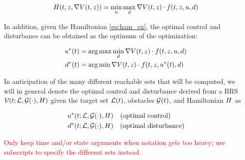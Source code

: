 \begin{equation}
\label{eq:ham_ex}
\begin{aligned}
\ham(t, \state, \nabla \valfunc(t,\state)) = \min_\ctrl \max_\dstb \nabla \valfunc(t,\state) \cdot \fdyn(t, \state, \ctrl, \dstb)
\end{aligned}
\end{equation}

In addition, given the Hamiltonian \eqref{eq:ham_ex}, the optimal control and disturbance can be obtained as the optimum of the optimization:

\begin{equation}
\label{eq:opt_ctrl_dstb_ex}
\begin{aligned}
\ctrl^*(t) &= \arg \max \min_\dstb \nabla \valfunc(t,\state) \cdot \fdyn(t, \state, \ctrl, \dstb)\\
\dstb^*(t) &= \arg \min \nabla \valfunc(t,\state) \cdot \fdyn(t, \state, \ctrl^*(t), \dstb)
\end{aligned}
\end{equation}

In anticipation of the many different reachable sets that will be computed, we will in general denote the optimal control and disturbance derived from a BRS $\mathcal{V}(t; \mathcal{L}, \mathcal{G}(\cdot), H)$ given the target set $\mathcal{L}(t)$, obstacles $\mathcal{G}(t)$, and Hamiltonian $H$ as 

\begin{equation}
\label{eq:opt_ctrl}
\begin{aligned}
\ctrl^*(t; \targetset, \obsset(\cdot), \ham) &\quad \text{(optimal control)} \\
\dstb^*(t; \targetset, \obsset(\cdot), \ham) &\quad \text{(optimal disturbance)}
\end{aligned}
\end{equation}

\textcolor{red}{Only keep time and/or state arguments when notation gets too heavy; use subscripts to specify the different sets instead.}
